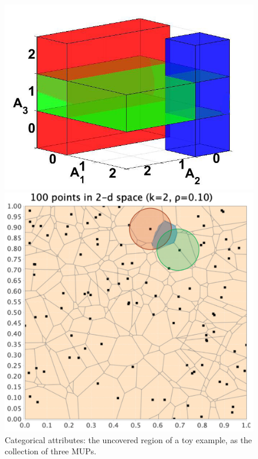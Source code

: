 \documentclass[11pt]{article}
\begin{document}
\begin{figure}[!tb]
    \begin{minipage}[t]{0.31\linewidth}
        \centering
        \includegraphics[width=\textwidth]{submissions/submission1/shahbazi/covcube1.jpg}
        \caption{\small Categorical attributes: the uncovered region of a toy example, as the collection of three MUPs.}
        \label{fig:covcube1}
    \end{minipage}
    \hfill
    \begin{minipage}[t]{0.31\linewidth}
        \centering
        \includegraphics[width=\textwidth]{submissions/submission1/shahbazi/cvrg_2_1.jpg}

\end{minipage}
\end{figure}
\end{document}
